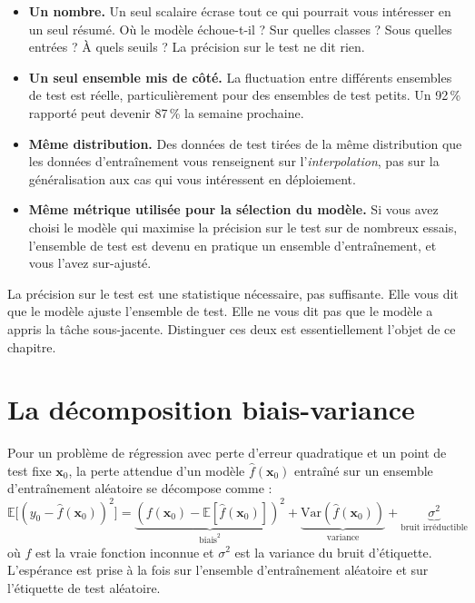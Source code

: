 \begin{itemize}
  \item \textbf{Un nombre.} Un seul scalaire écrase tout ce qui pourrait vous intéresser en un seul résumé. Où le modèle échoue-t-il ? Sur quelles classes ? Sous quelles entrées ? À quels seuils ? La précision sur le test ne dit rien.
  \item \textbf{Un seul ensemble mis de côté.} La fluctuation entre différents ensembles de test est réelle, particulièrement pour des ensembles de test petits. Un 92\,\% rapporté peut devenir 87\,\% la semaine prochaine.
  \item \textbf{Même distribution.} Des données de test tirées de la même distribution que les données d'entraînement vous renseignent sur l'\emph{interpolation}, pas sur la généralisation aux cas qui vous intéressent en déploiement.
  \item \textbf{Même métrique utilisée pour la sélection du modèle.} Si vous avez choisi le modèle qui maximise la précision sur le test sur de nombreux essais, l'ensemble de test est devenu en pratique un ensemble d'entraînement, et vous l'avez sur-ajusté.
\end{itemize}

\begin{intuition}
La précision sur le test est une statistique nécessaire, pas suffisante. Elle vous dit que le modèle ajuste l'ensemble de test. Elle ne vous dit pas que le modèle a appris la tâche sous-jacente. Distinguer ces deux est essentiellement l'objet de ce chapitre.
\end{intuition}

\section{La décomposition biais-variance}

Pour un problème de régression avec perte d'erreur quadratique et un point de test fixe $\bm{x}_0$, la perte attendue d'un modèle $\hat{f}(\bm{x}_0)$ entraîné sur un ensemble d'entraînement aléatoire se décompose comme :
\[
\mathbb{E}\bigl[(y_0 - \hat{f}(\bm{x}_0))^2\bigr] = \underbrace{(f(\bm{x}_0) - \mathbb{E}[\hat{f}(\bm{x}_0)])^2}_{\text{biais}^2} + \underbrace{\mathrm{Var}(\hat{f}(\bm{x}_0))}_{\text{variance}} + \underbrace{\sigma^2}_{\text{bruit irréductible}}
\]
où $f$ est la vraie fonction inconnue et $\sigma^2$ est la variance du bruit d'étiquette. L'espérance est prise à la fois sur l'ensemble d'entraînement aléatoire et sur l'étiquette de test aléatoire.


